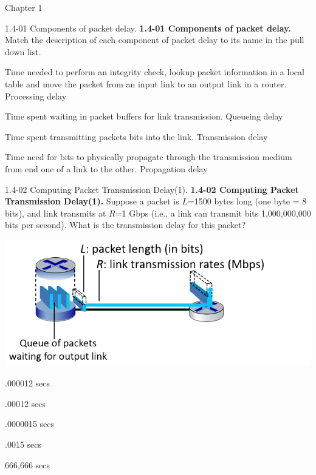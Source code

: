 \documentclass[a4paper]{article}
\begin{document}
\begin{quiz}{Chapter 1}
\begin{matching}[points=1,shuffle=true]{1.4-01 Components of packet delay.}
\textbf{1.4-01 Components of packet delay.}
Match the description of each component of packet delay to its name in the pull down list.

\item Time needed to perform an integrity check, lookup packet information in a local table and move the packet from an input link to an output link in a router. \answer Processing delay
\item Time spent waiting in packet buffers for link transmission. \answer Queueing delay
\item Time spent transmitting packets bits into the link. \answer Transmission delay
\item Time need for bits to physically propagate through the transmission medium from end one of a link to the other. \answer Propagation delay
\end{matching}


\begin{multi}[points=1,shuffle=true]{1.4-02 Computing Packet Transmission Delay(1).}
\textbf{1.4-02 Computing Packet Transmission Delay(1).} 
Suppose a packet is $L$=1500 bytes long (one byte = 8 bits), and link transmits at $R$=1 Gbps (i.e., a link can transmit bits 1,000,000,000 bits per second).  
What is the transmission delay for this packet?
\begin{center}
\includegraphics[width=\linewidth]{figs/1.4.2.png}
\end{center}
\item* .000012 secs
\item .00012 secs
\item .0000015 secs
\item .0015 secs
\item 666,666 secs
\end{multi}


\end{quiz}
\end{document}
